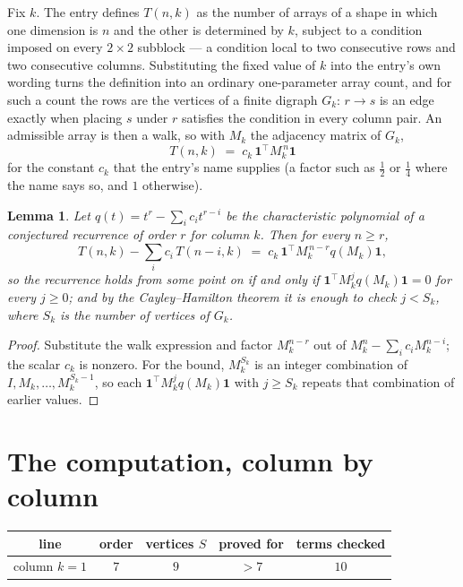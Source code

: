 \documentclass[11pt,a4paper]{article}
\theoremstyle{plain}
\newtheorem{lemma}[theorem]{Lemma}
\theoremstyle{definition}
\begin{document}
Fix $k$. The entry defines $T(n,k)$ as the number of arrays of a shape in which one dimension
is $n$ and the other is determined by $k$, subject to a condition imposed on every
$2\times2$ subblock --- a condition local to two consecutive rows and two consecutive columns.
Substituting the fixed value of $k$ into the entry's own wording turns the definition into an
ordinary one-parameter array count, and for such a count the rows are the vertices of a finite
digraph $G_k$: $r\to s$ is an edge exactly when placing $s$ under $r$ satisfies the condition
in every column pair. An admissible array is then a walk, so with $M_k$ the adjacency matrix
of $G_k$,
\[
T(n,k)\;=\;c_k\,\mathbf{1}^{\!\top}M_k^{\,n}\mathbf{1}
\]
for the constant $c_k$ that the entry's name supplies (a factor such as $\tfrac12$ or
$\tfrac14$ where the name says so, and $1$ otherwise).

\begin{lemma}\label{lem:crit}
Let $q(t)=t^{r}-\sum_i c_it^{r-i}$ be the characteristic polynomial of a conjectured
recurrence of order $r$ for column $k$. Then for every $n\ge r$,
\[
T(n,k)-\sum_i c_i\,T(n-i,k)\;=\;c_k\,\mathbf{1}^{\!\top}M_k^{\,n-r}q(M_k)\mathbf{1},
\]
so the recurrence holds from some point on if and only if
$\mathbf{1}^{\!\top}M_k^{j}q(M_k)\mathbf{1}=0$ for every $j\ge0$; and by the
Cayley--Hamilton theorem it is enough to check $j<S_k$, where $S_k$ is the number of vertices
of $G_k$.
\end{lemma}

\begin{proof}
Substitute the walk expression and factor $M_k^{n-r}$ out of $M_k^{n}-\sum_ic_iM_k^{n-i}$;
the scalar $c_k$ is nonzero. For the bound, $M_k^{S_k}$ is an integer combination of
$I,M_k,\dots,M_k^{S_k-1}$, so each $\mathbf{1}^{\!\top}M_k^{j}q(M_k)\mathbf{1}$ with
$j\ge S_k$ repeats that combination of earlier values.
\end{proof}

\section{The computation, column by column}

\begin{center}
\begin{tabular}{ccccc}
line & order & vertices $S$ & proved for & terms checked \\ \hline
column $k$$=1$ & $7$ & $9$ & $>7$ & $10$ \\
\end{tabular}
\end{center}
\end{document}
